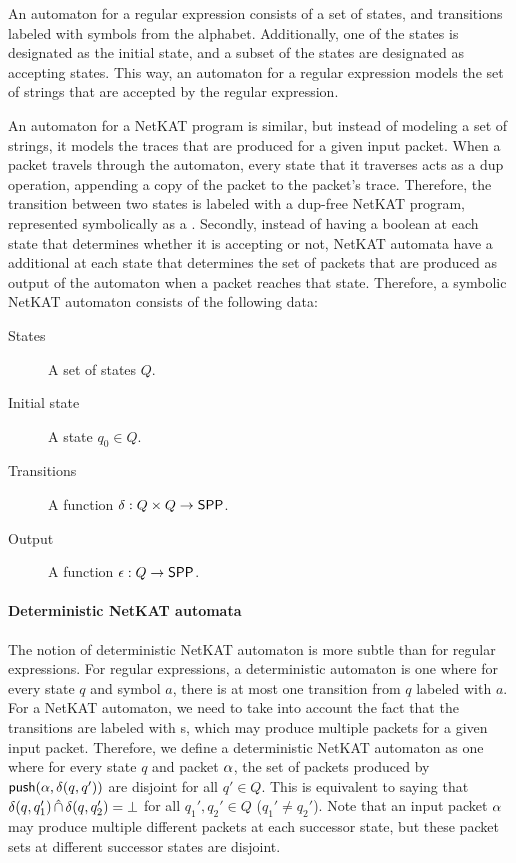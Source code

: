 \documentclass[acmsmall,dvipsnames,nonacm]{acmart}
\begin{document}
An automaton for a regular expression consists of a set of states, and
transitions labeled with symbols from the alphabet.  Additionally, one
of the states is designated as the initial state, and a subset of the
states are designated as accepting states.  This way, an automaton for
a regular expression models the set of strings that are accepted by
the regular expression.

An automaton for a NetKAT program is similar, but instead of modeling
a set of strings, it models the traces that are produced for a given
input packet.  When a packet travels through the automaton, every
state that it traverses acts as a $\text{dup}$ operation, appending a
copy of the packet to the packet's trace.  Therefore, the transition
between two states is labeled with a dup-free NetKAT program,
represented symbolically as a \SPPn{}.  Secondly, instead of having a
boolean at each state that determines whether it is accepting or not,
NetKAT automata have a additional \SPPn{} at each state that
determines the set of packets that are produced as output of the
automaton when a packet reaches that state.  Therefore, a symbolic
NetKAT automaton consists of the following data:
\begin{description}
    \item[States] A set of states $Q$.
    \item[Initial state] A state $q_0 \in Q$.
    \item[Transitions] A function $\delta : Q \times Q \to \mathsf{SPP}$.
    \item[Output] A function $\epsilon : Q \to \mathsf{SPP}$.
\end{description}

\paragraph{Deterministic NetKAT automata}
%
The notion of deterministic NetKAT automaton is more subtle than for
regular expressions.  For regular expressions, a deterministic
automaton is one where for every state $q$ and symbol $a$, there is at
most one transition from $q$ labeled with $a$.  For a NetKAT
automaton, we need to take into account the fact that the transitions
are labeled with \SPPn{}s, which may produce multiple packets for a
given input packet.  Therefore, we define a deterministic NetKAT
automaton as one where for every state $q$ and packet $\alpha$, the set
of packets produced by $\mathsf{push}(\alpha,\delta(q,q'))$ are disjoint
for all $q' \in Q$.  This is equivalent to saying that $\delta(q,q_1')
\mathop{\hat{\cap}} \delta(q,q_2') = \bot$ for all $q_1',q_2' \in Q$
($q_1' \neq q_2'$).  Note that an input packet $\alpha$ may produce
multiple different packets at each successor state, but these packet
sets at different successor states are disjoint.
\end{document}

